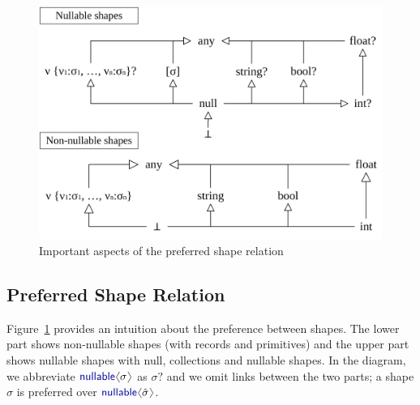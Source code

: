 \documentclass[pldi-cameraready]{sigplanconf-pldi16}
\newcommand{\langl}{\begin{picture}(4.5,7)
\put(1.1,2.5){\rotatebox{60}{\line(1,0){5.5}}}
\put(1.1,2.5){\rotatebox{300}{\line(1,0){5.5}}}
\end{picture}}
\newcommand{\rangl}{\begin{picture}(4.5,7)
\put(.9,2.5){\rotatebox{120}{\line(1,0){5.5}}}
\put(.9,2.5){\rotatebox{240}{\line(1,0){5.5}}}
\end{picture}}
\newcommand{\kvd}[1]{\textnormal{\textcolor{kvdclr}{\sffamily #1}}}
\begin{document}

\begin{figure}
\begin{center}
\includegraphics[scale=0.80,clip]{images/hierarchy.png} %
\end{center}
\vspace{-0.5em}
\caption{Important aspects of the preferred shape relation}
\label{fig:subtyping-diagram}
\end{figure}


\subsection{Preferred Shape Relation}
\label{sec:inference-subtyping}

Figure~\ref{fig:subtyping-diagram} provides an intuition about the preference between
shapes. The lower part shows non-nullable shapes (with records and primitives) and the upper part
shows nullable shapes with \kvd{null}, collections and nullable shapes. In the diagram, we
abbreviate $\kvd{nullable}\langl\sigma\rangl$ as $\sigma?$ and we omit links between the two parts;
a shape $\hat{\sigma}$ is preferred over $\kvd{nullable}\langl\hat{\sigma}\rangl$.
\end{document}

